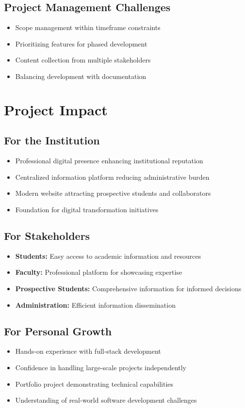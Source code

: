 \documentclass[12pt,a4paper]{report}
\begin{document}
\subsection*{Project Management Challenges}
\begin{itemize}
    \item Scope management within timeframe constraints
    \item Prioritizing features for phased development
    \item Content collection from multiple stakeholders
    \item Balancing development with documentation
\end{itemize}

\section{Project Impact}

\subsection*{For the Institution}
\begin{itemize}
    \item Professional digital presence enhancing institutional reputation
    \item Centralized information platform reducing administrative burden
    \item Modern website attracting prospective students and collaborators
    \item Foundation for digital transformation initiatives
\end{itemize}

\subsection*{For Stakeholders}
\begin{itemize}
    \item \textbf{Students:} Easy access to academic information and resources
    \item \textbf{Faculty:} Professional platform for showcasing expertise
    \item \textbf{Prospective Students:} Comprehensive information for informed decisions
    \item \textbf{Administration:} Efficient information dissemination
\end{itemize}

\subsection*{For Personal Growth}
\begin{itemize}
    \item Hands-on experience with full-stack development
    \item Confidence in handling large-scale projects independently
    \item Portfolio project demonstrating technical capabilities
    \item Understanding of real-world software development challenges
\end{itemize}
\end{document}
